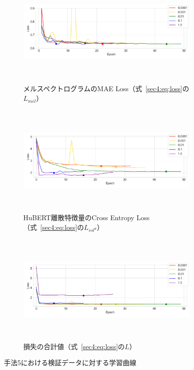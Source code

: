 \documentclass[12pt]{jarticle}
\numberwithin{equation}{section}    %
\numberwithin{figure}{section}      %
\numberwithin{table}{section}      %
\begin{document}
\begin{figure}[bt]
    \centering
    \begin{subfigure}{\linewidth}
        \centering
        \includegraphics[height=55mm]{./figure/sec4/learning_curve/impact_of_loss_weights_across_methods/5/mel_loss.png}
        \caption{メルスペクトログラムのMAE Loss（式~\eqref{sec4:eq:loss}の$L_{mel}$）}
        \label{sec4:fig:learning_curve_method_5_val_mel_loss}
    \end{subfigure}
    \begin{subfigure}{\linewidth}
        \centering
        \includegraphics[height=55mm]{./figure/sec4/learning_curve/impact_of_loss_weights_across_methods/5/ssl_feature_cluster_loss.png}
        \caption{HuBERT離散特徴量のCross Entropy Loss（式~\eqref{sec4:eq:loss}の$L_{ssl^{d}}$）}
        \label{sec4:fig:learning_curve_method_5_val_ssl_feature_cluster_loss}
    \end{subfigure}
    \begin{subfigure}{\linewidth}
        \centering
        \includegraphics[height=55mm]{./figure/sec4/learning_curve/impact_of_loss_weights_across_methods/5/total_loss.png}
        \caption{損失の合計値（式~\eqref{sec4:eq:loss}の$L$）}
        \label{sec4:fig:learning_curve_method_5_val_total_loss}
    \end{subfigure}
    \caption{手法5における検証データに対する学習曲線}
    \label{sec4:fig:learning_curve_method_5_val_losses}
\end{figure}
\end{document}
